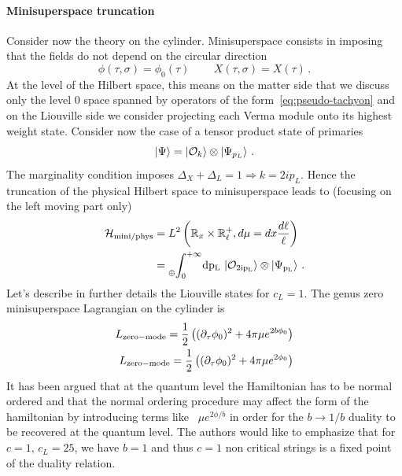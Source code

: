 \documentclass[a4paper]{article}
\begin{document}
\paragraph{Minisuperspace truncation}
Consider now the theory on the cylinder. Minisuperspace consists in imposing that the fields do not depend on the circular direction 
\begin{equation}
    \phi(\tau,\sigma)=\phi_0(\tau)\, \qquad X(\tau,\sigma)=X(\tau)\,.
\end{equation}
At the level of the Hilbert space, this means on the matter side that we discuss only the level $0$ space spanned by operators of the form~\eqref{eq:pseudo-tachyon} and on the Liouville side we consider projecting each Verma module onto its highest weight state. Consider now the case of a tensor product state of primaries
\begin{equation}\label{eq:tensorprimaries}
    \ket{\Psi} = \ket{\mathcal{O}_{k}}\otimes \ket{\Psi_{p_L}}\,.
\end{equation}
The marginality condition imposes $\Delta_X+\Delta_L =1 \Rightarrow k = 2ip_L$. Hence the truncation of the physical Hilbert space to minisuperspace leads to (focusing on the left moving part only)
\begin{equation}\label{eq:minihilbert}
\begin{aligned}
    \mathcal{H}_{\rm mini/ phys}
    &=L^2\left(\mathbb{R}_{x}\times \mathbb{R}^{+}_{\ell}, d\mu = dx\frac{d\ell}{\ell}\right)\\
    &= \underset{\oplus}{}{\int_0^{+\infty} }\rm{d}p_L \,\ket{\mathcal{O}_{2ip_L}}\otimes \ket{\Psi_{p_L}}\,.\\
\end{aligned}
\end{equation}
Let's describe in further details the Liouville states for $c_L=1$. The genus zero minisuperspace Lagrangian on the cylinder is
\begin{equation}
\begin{aligned}
     L_{\rm zero-mode} = \frac{1}{2}\left((\partial_\tau \phi_0)^2 + 4\pi \mu e^{2b \phi_0}\right)\\
     L_{\rm zero-mode} = \frac{1}{2}\left((\partial_\tau \phi_0)^2 + 4\pi \mu e^{2 \phi_0}\right)
\end{aligned}
\end{equation}
It has been argued that at the quantum level the Hamiltonian has to be normal ordered and that the normal ordering procedure may affect the form of the hamiltonian by introducing terms like~\cite{teschner2000remarksliouvilletheoryboundary} $\mu e^{2\phi/b}$ in order for the $b\to1/b$ duality to be recovered at the quantum level. The authors would like to emphasize that for $c=1,\,c_L=25$, we have $b=1$ and thus $c=1$ non critical strings is a fixed point of the duality relation.
\end{document}
